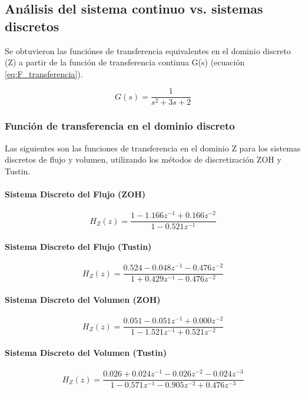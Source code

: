 \documentclass[journal]{IEEEtran}
\begin{document}
\subsection{\textbf{Análisis del sistema continuo vs. sistemas discretos}}

Se obtuvieron las funciónes de transferencia equivalentes en el dominio discreto (Z) a partir de la función de transferencia continua G(s) (ecuación \ref{eq:F_transferencia}). 

\begin{equation}
    G(s) = \frac{1}{s^2 + 3s + 2}
    \label{eq:F_transferencia}
\end{equation}


\subsubsection{\textbf{Función de transferencia en el dominio discreto}}

Las siguientes son las funciones de transferencia en el dominio Z para los sistemas discretos de flujo y volumen, utilizando los métodos de discretización ZOH y Tustin.

\paragraph{Sistema Discreto del Flujo (ZOH)}

$$H_Z(z) = \frac{1 - 1.166z^{-1} + 0.166z^{-2}}{1 - 0.521z^{-1}}$$

\paragraph{Sistema Discreto del Flujo (Tustin)}

$$H_Z(z) = \frac{0.524 - 0.048z^{-1} - 0.476z^{-2}}{1 + 0.429z^{-1} - 0.476z^{-2}}$$

\paragraph{Sistema Discreto del Volumen (ZOH)}

$$H_Z(z) = \frac{0.051 - 0.051z^{-1} + 0.000z^{-2}}{1 - 1.521z^{-1} + 0.521z^{-2}}$$

\paragraph{Sistema Discreto del Volumen (Tustin)}

$$H_Z(z) = \frac{0.026 + 0.024z^{-1} - 0.026z^{-2} - 0.024z^{-3}}{1 - 0.571z^{-1} - 0.905z^{-2} + 0.476z^{-3}}$$
\end{document}
